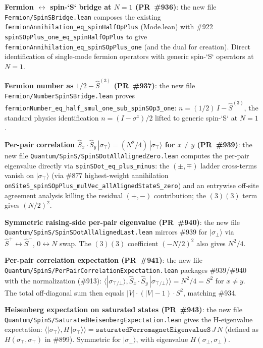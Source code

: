\documentclass[a4paper,11pt]{article}
\begin{document}
\textbf{Fermion $\leftrightarrow$ spin-`S` bridge at $N = 1$
(PR~\#936)}: the new file
\texttt{Fermion/SpinSBridge.lean} composes the existing
\texttt{fermionAnnihilation\_eq\_spinHalfOpPlus} (Mode.lean) with
\#922 \texttt{spinSOpPlus\_one\_eq\_spinHalfOpPlus} to give
\texttt{fermionAnnihilation\_eq\_spinSOpPlus\_one} (and the dual
for creation). Direct identification of single-mode fermion
operators with generic spin-`S` operators at $N = 1$.

\textbf{Fermion number as $1/2 - \hat{S}^{(3)}$ (PR~\#937)}: the
new file \texttt{Fermion/NumberSpinSBridge.lean} proves
\texttt{fermionNumber\_eq\_half\_smul\_one\_sub\_spinSOp3\_one}:
$n = (1/2)\,I - \hat{S}^{(3)}$, the standard physics identification
$n = (I - \sigma^z)/2$ lifted to generic spin-`S` at $N = 1$.

\textbf{Per-pair correlation $\hat{S}_x\cdot\hat{S}_y\,|\sigma_\top\rangle
= (N^2/4)\,|\sigma_\top\rangle$ for $x\neq y$ (PR~\#939)}: the new
file \texttt{Quantum/SpinS/SpinSDotAllAlignedZero.lean} computes the
per-pair eigenvalue directly via \texttt{spinSDot\_eq\_plus\_minus}:
the $(\pm,\mp)$ ladder cross-terms vanish on $|\sigma_\top\rangle$
(via \#877 highest-weight annihilation
\texttt{onSiteS\_spinSOpPlus\_mulVec\_allAlignedStateS\_zero})
and an entrywise off-site agreement analysis killing the residual
$(+,-)$ contribution; the $(3)(3)$ term gives $(N/2)^2$.

\textbf{Symmetric raising-side per-pair eigenvalue (PR~\#940)}: the
new file \texttt{Quantum/SpinS/SpinSDotAllAlignedLast.lean} mirrors
\#939 for $|\sigma_\bot\rangle$ via $\hat{S}^+ \leftrightarrow
\hat{S}^-$, $0 \leftrightarrow N$ swap. The $(3)(3)$ coefficient
$(-N/2)^2$ also gives $N^2/4$.

\textbf{Per-pair correlation expectation (PR~\#941)}: the new file
\texttt{Quantum/SpinS/PerPairCorrelationExpectation.lean} packages
\#939/\#940 with the normalization (\#913):
$\langle|\sigma_{\top/\bot}\rangle, \hat{S}_x\cdot\hat{S}_y\,
|\sigma_{\top/\bot}\rangle\rangle = N^2/4 = S^2$ for $x \neq y$.
The total off-diagonal sum then equals $|V|\cdot(|V|-1)\cdot S^2$,
matching \#934.

\textbf{Heisenberg expectation on saturated states (PR~\#943)}: the
new file \texttt{Quantum/SpinS/SaturatedHeisenbergExpectation.lean}
gives the H-eigenvalue expectation:
$\langle|\sigma_\top\rangle, H\,|\sigma_\top\rangle\rangle =
\texttt{saturatedFerromagnetEigenvalueS}\,J\,N$ (defined as
$H(\sigma_\top, \sigma_\top)$ in \#899). Symmetric for
$|\sigma_\bot\rangle$, with eigenvalue $H(\sigma_\bot, \sigma_\bot)$.
\end{document}
